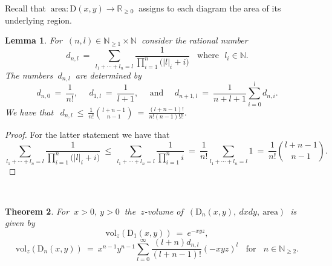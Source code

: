 \documentclass[10pt,leqeq]{article}
\newtheorem{thm}{Theorem}%
\newtheorem{lem}[thm]{Lemma}%
\begin{document}
Recall that $\ \mathrm{area}: \mathrm{D}(x,y) \rightarrow \mathbb{\mathbb{R}}_{\geq 0} \ $
assigns to each diagram the area of its underlying region.\\

\begin{lem}\label{l8}
{\em For $ \  (n,l) \in \mathbb{N}_{\geq 1}\times \mathbb{N} \ $ consider  the  rational number
$$d_{n,l} \ = \ \sum_{l_1+\cdots+l_n=l}
 \frac{1}{\prod_{i=1}^{n}\big(|l|_i+i\big)} \ \ \ \ \mbox{where} \ \ \ l_i\in \mathbb{N}.$$
The numbers $\ d_{n,l} \ $ are determined by 
$$d_{n,0}\ = \ \frac{1}{n!}, \   \ \ \ \ \  d_{1,l}\ = \ \frac{1}{l+1}, \ \ \ \ \ \  \mbox{and}\ \  \ \ \ \
d_{n+1,l}\ = \ \frac{1}{n+l+1}\sum_{i=0}^{l}d_{n,i} .$$ 
We have that
$\ \ \displaystyle d_{n,l} \ \leq \  \frac{1}{n!}\binom{l+n-1}{n-1} \ = \ 
\frac{(l+n-1)!}{n!(n-1)!l!}.$
}
\end{lem}

\begin{proof}
For the latter statement we have that
$$\sum_{l_1+\cdots+l_n=l}
\frac{1}{\prod_{i=1}^{n}\big(|l|_i+i\big)}\ \leq \ \sum_{l_1+\cdots+l_n=l}\frac{1}{\prod_{i=1}^{n}i}\ = \ \frac{1}{n!}\sum_{l_1+\cdots+l_n=l}1 \ = \
\frac{1}{n!}\binom{l+n-1}{n-1}.$$ 
\end{proof}

\

\begin{thm}\label{22}
{\em For $\ x>0,\ y>0 \ $ the $\ z$-volume 
  of  $\ (\mathrm{D}_n(x,y),\ dxdy,\ \mathrm{area}) \ $ is given by $$\ \mathrm{vol}_{z}(\mathrm{D}_1(x,y)) \ = \ e^{-xyz}, \ $$ $$ \mathrm{vol}_z(\mathrm{D}_n(x,y)) \ = \
  x^{n-1}y^{n-1}\sum_{l=0}^{\infty} \frac{(l+n)d_{n,l}}{(l+n-1)!} (-xyz)^l 
  \ \ \ \ \mbox{for} \ \ \ \ n \in \mathbb{N}_{\geq 2}.$$
}  
\end{thm}
\end{document}
